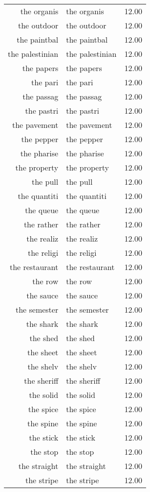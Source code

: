 \begin{table}[ht]
\begin{tabular}{rlr}
  the organis & the organis & 12.00 \\ 
  the outdoor & the outdoor & 12.00 \\ 
  the paintbal & the paintbal & 12.00 \\ 
  the palestinian & the palestinian & 12.00 \\ 
  the papers & the papers & 12.00 \\ 
  the pari & the pari & 12.00 \\ 
  the passag & the passag & 12.00 \\ 
  the pastri & the pastri & 12.00 \\ 
  the pavement & the pavement & 12.00 \\ 
  the pepper & the pepper & 12.00 \\ 
  the pharise & the pharise & 12.00 \\ 
  the property & the property & 12.00 \\ 
  the pull & the pull & 12.00 \\ 
  the quantiti & the quantiti & 12.00 \\ 
  the queue & the queue & 12.00 \\ 
  the rather & the rather & 12.00 \\ 
  the realiz & the realiz & 12.00 \\ 
  the religi & the religi & 12.00 \\ 
  the restaurant & the restaurant & 12.00 \\ 
  the row & the row & 12.00 \\ 
  the sauce & the sauce & 12.00 \\ 
  the semester & the semester & 12.00 \\ 
  the shark & the shark & 12.00 \\ 
  the shed & the shed & 12.00 \\ 
  the sheet & the sheet & 12.00 \\ 
  the shelv & the shelv & 12.00 \\ 
  the sheriff & the sheriff & 12.00 \\ 
  the solid & the solid & 12.00 \\ 
  the spice & the spice & 12.00 \\ 
  the spine & the spine & 12.00 \\ 
  the stick & the stick & 12.00 \\ 
  the stop & the stop & 12.00 \\ 
  the straight & the straight & 12.00 \\ 
  the stripe & the stripe & 12.00 \\ 

\end{tabular}
\end{table}
